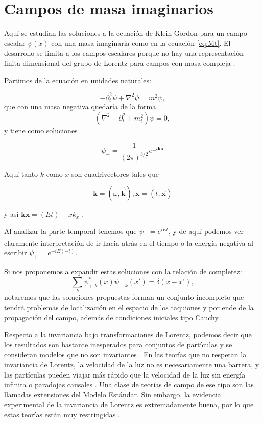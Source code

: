 \documentclass[twocolumn,preprintnumbers,amsmath,amssymb]{revtex4}
\begin{document}
\section{Campos de masa imaginarios}

Aquí se estudian las soluciones a la ecuación de Klein-Gordon para un campo escalar $\psi(x)$ con una masa imaginaria como en la ecuación \eqref{eq:Mt}. El desarrollo se limita a los campos escalares porque no hay una representación finita-dimensional del grupo de Lorentz para campos con masa compleja \cite{feinberg1967possibility}.

Partimos de la ecuación en unidades naturales:

\begin{equation}
-\partial _{t}^{2}\psi +\nabla ^{2}\psi =m^{2}\psi,
\label{eq:Klein1}
\end{equation}
que con una masa negativa quedaría de la forma
\begin{equation}
(\nabla^{2} - \partial _{t}^{2} + m_t^{2} ) \psi = 0,
\label{eq:Klein2}
\end{equation}
y tiene como soluciones 

\begin{equation}
\psi_{\pm} = \frac{1}{ (2 \pi)^{3/2} } e^{\pm i \mathbf{k} \mathbf{x}}
\label{eq:KleinSolutions}
\end{equation}

Aquí tanto $k$ como $x$ son cuadrivectores tales que

\begin{equation}
\mathbf{k} = \left(\omega, \vec{\mathbf{k}} \right) , \mathbf{x} = \left(t, \vec{\mathbf{x}} \right)
\label{eq:WK}
\end{equation}

y así $ \mathbf{k} \mathbf{x} = ( E t ) - x k_x $ .

Al analizar la parte temporal tenemos que $\psi_{+} = e^{iEt}$, y de aquí podemos ver claramente interpretación de ir hacia atrás en el tiempo o la energía negativa al escribir $\psi_{+} = e^{-iE(-t)}$.

Si nos proponemos a expandir estas soluciones con la relación de completez: $$\sum_k \psi_{+,k}^{*}(x) \psi_{+,k}(x') = \delta(x -x'), $$ notaremos que las soluciones propuestas forman un conjunto incompleto que tendrá problemas de localización en el espacio de los taquiones y por ende de la propagación del campo, además de condiciones iniciales tipo Cauchy \cite{feinberg1967possibility}.

Respecto a la invariancia bajo transformaciones de Lorentz, podemos decir que los resultados son bastante inesperados para conjuntos de partículas y se consideran modelos que no son invariantes \cite{feinberg1978lorentz}. En las teorías que no respetan la invariancia de Lorentz, la velocidad de la luz no es necesariamente una barrera, y las partículas pueden viajar más rápido que la velocidad de la luz sin energía infinita o paradojas causales \cite{barcelo2010impossibility}. Una clase de teorías de campo de ese tipo son las llamadas extensiones del Modelo Estándar. Sin embargo, la evidencia experimental de la invariancia de Lorentz es extremadamente buena, por lo que estas teorías están muy restringidas \cite{coleman1999high}.
\end{document}
